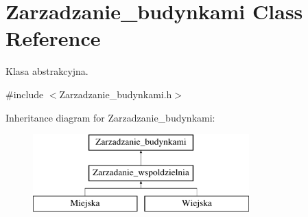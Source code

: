 \hypertarget{class_zarzadzanie__budynkami}{}\section{Zarzadzanie\+\_\+budynkami Class Reference}
\label{class_zarzadzanie__budynkami}


Klasa abstrakcyjna.  




{\ttfamily \#include $<$Zarzadzanie\+\_\+budynkami.\+h$>$}

Inheritance diagram for Zarzadzanie\+\_\+budynkami\+:\begin{figure}[H]
\begin{center}
\leavevmode
\includegraphics[height=3.000000cm]{class_zarzadzanie__budynkami}
\end{center}
\end{figure}
